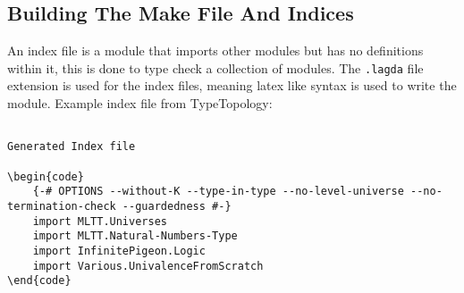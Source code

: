 
\subsection{Building The Make File And Indices} \label{sub:build_make_index}

An index file is a module that imports other modules but has no definitions
within it, this is done to type check a collection of modules. The
\texttt{.lagda} file extension is used for the index files, meaning latex like
syntax is used to write the module. Example index file from TypeTopology:

\begin{lstlisting}
    
Generated Index file

\begin{code}
    {-# OPTIONS --without-K --type-in-type --no-level-universe --no-termination-check --guardedness #-}
    import MLTT.Universes
    import MLTT.Natural-Numbers-Type
    import InfinitePigeon.Logic
    import Various.UnivalenceFromScratch
\end{code}
\end{lstlisting}

